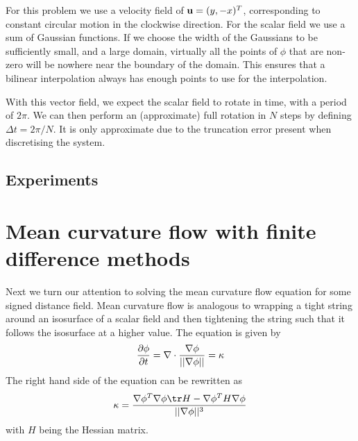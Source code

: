 \documentclass[sigconf]{acmart}
\begin{document}
For this problem we use a velocity field of $ \mathbf{u} = (y, -x)^T $, corresponding to constant circular motion in the clockwise direction. For the scalar field we use a sum of Gaussian functions. If we choose the width of the Gaussians to be sufficiently small, and a large domain, virtually all the points of $ \phi $ that are non-zero will be nowhere near the boundary of the domain. This ensures that a bilinear interpolation always has enough points to use for the interpolation.

With this vector field, we expect the scalar field to rotate in time, with a period of $ 2\pi $. We can then perform an (approximate) full rotation in $ N $ steps by defining $ \Delta t = 2\pi/N $. It is only approximate due to the truncation error present when discretising the system.


\subsection{Experiments}




\section{Mean curvature flow with finite difference methods}
Next we turn our attention to solving the mean curvature flow equation for some signed distance field. Mean curvature flow is analogous to wrapping a tight string around an isosurface of a scalar field and then tightening the string such that it follows the isosurface at a higher value. The equation is given by
\begin{equation}\label{key}
	\frac{\partial \phi}{\partial t} = \nabla \cdot \frac{\nabla \phi}{||\nabla \phi ||} = \kappa
\end{equation}
The right hand side of the equation can be rewritten as
\begin{equation}\label{key}
	\kappa = \frac{\grad \phi^T \grad \phi \tr H  - \grad\phi^T H \grad\phi}{||\grad\phi||^3}
\end{equation}
with $ H $ being the Hessian matrix.
\end{document}
